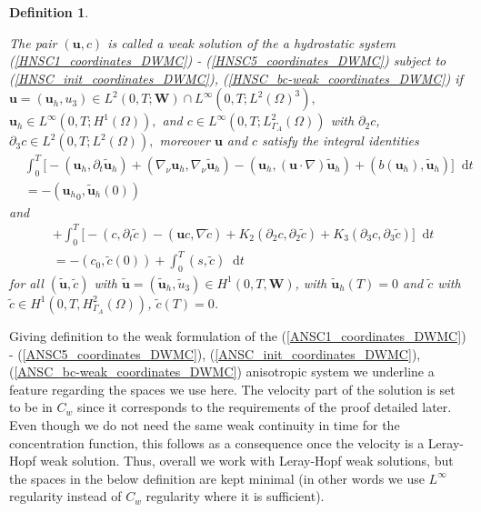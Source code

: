 \documentclass[12pt]{report}
\numberwithin{theorem}{chapter}
\numberwithin{corollary}{chapter}
\numberwithin{lemma}{chapter}
\numberwithin{remark}{chapter}
\newtheorem{definition}{Definition}
\numberwithin{definition}{chapter}
\numberwithin{prop}{chapter}
\newcommand*\diff{\mathop{}\!\mathrm{d}}
\begin{document}
\begin{definition} \label{definitionhydrostaticWF}

The pair $(\mathbf{u}, c)$ is called a weak solution of the a hydrostatic system (\ref{HNSC1_coordinates_DWMC}) - (\ref{HNSC5_coordinates_DWMC}) subject to (\ref{HNSC_init_coordinates_DWMC}), (\ref{HNSC_bc-weak_coordinates_DWMC}) if $\mathbf{u} = (\mathbf{u}_h, u_3) \in L^2 (0, T; \mathbf{W}) \cap L^\infty (0,T; L^2(\Omega)^3),$ $\mathbf{u}_h \in L^\infty(0,T; H^1(\Omega)),$ and $c \in L^\infty (0, T; L^2_{\Gamma_A}(\Omega))$ with $\partial_2 c$, $\partial_3 c \in L^2(0, T; L^2(\Omega)),$ moreover $\mathbf{u}$ and $c$ satisfy the integral identities
%
  \begin{equation}
    \begin{split}
      & \int_0^T \bigg[ -(\mathbf{u}_h, \partial_t \mathbf{\tilde{u}}_h) + (\nabla_\nu \mathbf{u}_h, \nabla_\nu \mathbf{\tilde{u}}_h) - (\mathbf{u}_h, (\mathbf{u} \cdot \nabla) \mathbf{\tilde{u}}_h) + (b(\mathbf{u}_h), \mathbf{\tilde{u}}_h) \bigg ] \diff t \\
      & = - ({\mathbf{u}_h}_0, \mathbf{\tilde{u}}_h(0)) \label{hydrostaticWF}
    \end{split}
  \end{equation}
%
  and
%
  \begin{equation}
    \begin{split} \nonumber
      &+ \int_0^T \bigg[ -(c, \partial_t \tilde{c}) -(\mathbf{u}c, \nabla \tilde{c}) + K_2 (\partial_2 c, \partial_2 \tilde{c}) + K_3 (\partial_3 c, \partial_3 \tilde{c}) \bigg ] \diff t \\
      & = - (c_0, \tilde{c}(0)) + \int_0^T (s,\tilde{c}) \diff t
    \end{split}
  \end{equation}
%
for all $(\mathbf{\tilde{u}}, \tilde{c})$ with $\mathbf{\tilde{u}} = (\mathbf{\tilde{u}}_h, \tilde{u}_3) \in H^1 (0,T, \mathbf{W})$, with $\mathbf{\tilde{u}}_h (T) = 0$ and $\tilde{c}$ with $\tilde{c} \in H^1 (0,T, H^2_{\Gamma_A} (\Omega))$, $\tilde{c} (T) = 0$.
  
  \end{definition}
  
  Giving definition to the weak formulation of the (\ref{ANSC1_coordinates_DWMC}) - (\ref{ANSC5_coordinates_DWMC}), (\ref{ANSC_init_coordinates_DWMC}), (\ref{ANSC_bc-weak_coordinates_DWMC}) anisotropic system we underline a feature regarding the spaces we use here. The velocity part of the solution is set to be in $C_w$ since it corresponds to the requirements of the proof detailed later. Even though we do not need the same weak continuity in time for the concentration function, this follows as a consequence once the velocity is a Leray-Hopf weak solution. Thus, overall we work with Leray-Hopf weak solutions, but the spaces in the below definition are kept minimal (in other words we use $L^\infty$ regularity instead of $C_w$ regularity where it is sufficient).
\end{document}
